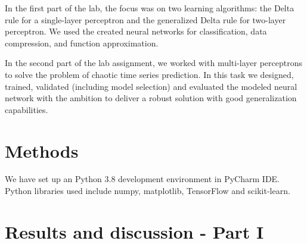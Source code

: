 \documentclass[a4paper]{article}
\begin{document}

In the first part of the lab, the focus was on two learning algorithms: the Delta rule for a
 single-layer perceptron and the generalized Delta rule for two-layer perceptron.
We used the created neural networks for classification, data compression, and function approximation.

In the second part of the lab assignment, we worked with multi-layer perceptrons to solve the problem of chaotic time series prediction. In this task we designed, trained, validated (including model selection) and evaluated the modeled neural
network with the ambition to deliver a robust solution with good generalization capabilities. %

\section{Methods}
We have set up an Python 3.8 development environment in PyCharm IDE. Python libraries used include numpy, matplotlib, TensorFlow and scikit-learn. %


\section{Results and discussion - Part I}
\end{document}
